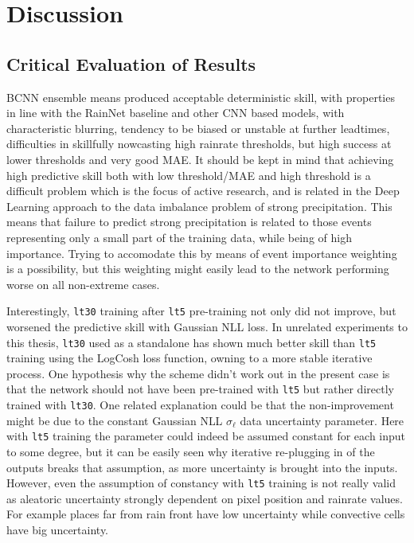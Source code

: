 \chapter{Discussion}
\label{chapter:discussion}


\section{Critical Evaluation of Results}


BCNN ensemble means produced acceptable deterministic skill, with properties in line with the RainNet baseline \cite{ayzel_rainnet_nodate} and other CNN based models, with characteristic blurring, tendency to be biased or unstable at further leadtimes, difficulties in skillfully nowcasting high rainrate thresholds, but high success at lower thresholds and very good MAE. It should be kept in mind that achieving high predictive skill both with low threshold/MAE and high threshold is a difficult problem which is the focus of active research, and is related in the Deep Learning approach to the data imbalance problem of strong precipitation. This means that failure to predict strong precipitation is related to those events representing only a small part of the training data, while being of high importance. Trying to accomodate this by means of event importance weighting is a possibility, but this weighting might easily lead to the network performing worse on all non-extreme cases.

Interestingly, \texttt{lt30} training after \texttt{lt5} pre-training not only did not improve, but worsened the predictive skill with Gaussian NLL loss. In unrelated experiments to this thesis, \texttt{lt30} used as a standalone has shown much better skill than \texttt{lt5} training using the LogCosh loss function, owning to a more stable iterative process. One hypothesis why the scheme didn't work out in the present case is that the network should not have been pre-trained with \texttt{lt5} but rather directly trained with \texttt{lt30}. One related explanation could be that the non-improvement might be due to the constant Gaussian NLL $\sigma_\ell$ data uncertainty parameter. Here with \texttt{lt5} training the parameter could indeed be assumed constant for each input to some degree, but it can be easily seen why iterative re-plugging in of the outputs breaks that assumption, as more uncertainty is brought into the inputs. However, even the assumption of constancy with \texttt{lt5} training is not really valid as aleatoric uncertainty strongly dependent on pixel position and rainrate values. For example places far from rain front have low uncertainty while convective cells have big uncertainty.

